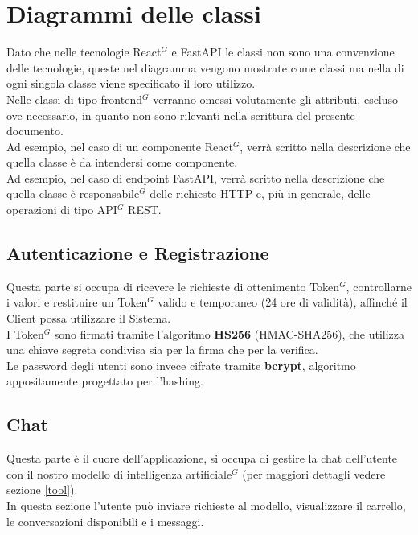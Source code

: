 \section{Diagrammi delle classi}

Dato che nelle tecnologie React$^G$ e FastAPI le classi non sono una convenzione delle tecnologie, queste nel diagramma vengono mostrate come classi ma nella  di ogni singola classe viene specificato il loro utilizzo.\\
Nelle classi di tipo frontend$^G$ verranno omessi volutamente gli attributi, escluso ove necessario, in quanto non sono rilevanti nella scrittura del presente documento.\\
Ad esempio, nel caso di un componente React$^G$, verrà scritto nella descrizione che quella classe è da intendersi come componente.\\
Ad esempio, nel caso di endpoint FastAPI, verrà scritto nella descrizione che quella classe  è responsabile$^G$ delle richieste HTTP e, più in generale, delle operazioni di tipo API$^G$ REST.

\subsection{Autenticazione e Registrazione}

Questa parte si occupa di ricevere le richieste di ottenimento Token$^G$, controllarne i valori e restituire un Token$^G$ valido e temporaneo (24 ore di validità), affinché il Client possa utilizzare il Sistema.\\
I Token$^G$ sono firmati tramite l'algoritmo \textbf{HS256} (HMAC-SHA256), che utilizza una chiave segreta condivisa sia per la firma che per la verifica.\\
Le password degli utenti sono invece cifrate tramite \textbf{bcrypt}, algoritmo appositamente progettato per l'hashing.



\newpage


\newpage
\subsection{Chat}

Questa parte è il cuore dell'applicazione, si occupa di gestire la chat dell'utente con il nostro modello di intelligenza artificiale$^G$ (per maggiori dettagli vedere sezione \ref{tool}).\\
In questa sezione l'utente può inviare richieste al modello, visualizzare il carrello, le conversazioni disponibili e i messaggi.

